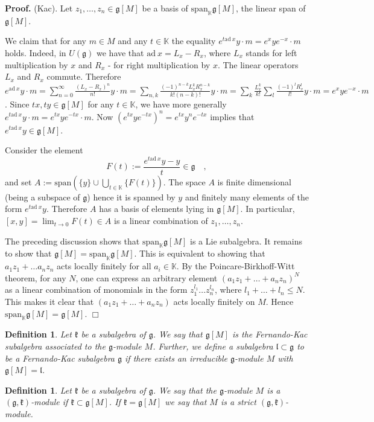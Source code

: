 \documentclass[12pt]{report}
\newenvironment{proof}[1][]{ \textbf{Proof#1. }}{$\Box$\medskip}
\newtheorem{defi}[theo]{Definition}
\newcommand {\KK} {\mathbb {K}}
\newcommand{\kk}{\mathfrak{k}}
\newcommand{\gG}{\mathfrak{g}}
\newcommand{\lL}{\mathfrak{l}}
\newcommand{\linspan}{\mathrm{span}}
\newcommand{\ad}{\mathrm{ad~}}
\begin{document}
\begin{proof} (Kac). 
Let $z_1,\dots,z_n\in\gG[M]$ be a basis of $\linspan_{\KK}\gG[M]$, the linear span of $\gG[M]$.

We claim that for any $m\in M$ and any $t\in\KK$ the equality $e^{t\ad x}y\cdot m=e^{x}ye^{-x}\cdot m$ holds. Indeed, in $U(\gG)$ we have that $\ad x=L_x-R_x$, where $L_x$ stands for left multiplication by $x$ and $R_x$ - for right multiplication by $x$. The linear operators $L_x$ and $R_x$ commute. Therefore $e^{\ad x}y\cdot m=\sum_{n=0}^\infty \frac{(L_x-R_x)^n}{n!}y\cdot m= \sum_{n,k} \frac{(-1)^{n-k} L_x^k R_x^{n-k}} {k!(n-k)!} y\cdot m=\sum_{k}\frac{L_x^k}{k!}\sum_{l} \frac{(-1)^lR_x^l}{l!}y\cdot m=e^xye^{-x}\cdot m$. Since $tx,ty\in\gG[M]$ for any $t\in\KK$, we have more generally $e^{t\ad x}y\cdot m=e^{tx}ye^{-tx}\cdot m$. Now $(e^{tx}ye^{-tx})^n=e^{tx}y^ne^{-tx}$ implies that $e^{t\ad x}y\in \gG[M]$. 

Consider the element
\[
F(t):=\frac{e^{t\ad x} y-y}{t} \in\gG\quad ,
\]
and set $A:=\linspan \left( \{y\}\cup\bigcup_{t\in\mathbb{K}} \{F(t)\}\right)$. The space $A$ is finite dimensional (being a subspace of $\gG$) hence it is spanned by $y$ and finitely many elements of the form $e^{t\ad x}y$. Therefore $A$ has a basis of elements lying in $\gG[M]$. In particular, $[x,y]=\lim_{t\to 0}F(t)\in A$ is a linear combination of $z_1, \dots, z_n$.

The preceding discussion shows that $\linspan_{\KK}\gG[M]$ is a Lie subalgebra. It remains to show that $\gG[M]=\linspan_{\KK}\gG[M]$. This is equivalent to showing that $a_1z_1+\dots a_nz_n$ acts locally finitely for all $a_i\in\KK$. By the Poincare-Birkhoff-Witt theorem, for any $N$, one can express an arbitrary element $(a_1z_1 +\dots+ a_nz_n)^N$ as a linear combination of monomials in the form $z_1^{l_1}\dots z_n^{l_n} $, where $l_1+\dots+l_n\leq N$. This makes it clear that  $(a_1z_1+\dots+ a_nz_n)$ acts locally finitely on $M$. Hence $\linspan_{\KK}\gG[M]=\gG[M] $.
\end{proof}
\begin{defi}
Let $\kk$ be a subalgebra of $\gG$. We say that $\gG[M]$ is the Fernando-Kac subalgebra associated to the $\gG$-module $M$. Further, we define a subalgebra $\lL\subset\gG$ to be a Fernando-Kac subalgebra $\gG$ if there exists an irreducible $\gG$-module $M$ with $\gG[M]=\lL$.
\end{defi}
\begin{defi}
Let $\kk$ be a subalgebra of $\gG$. We say that the $\gG$-module $M$ is a $(\gG,\kk)$-module if $\kk\subset\gG[M]$. If $\kk=\gG[M]$ we say that $M$ is a strict $(\gG,\kk)$-module.
\end{defi}
\end{document}
